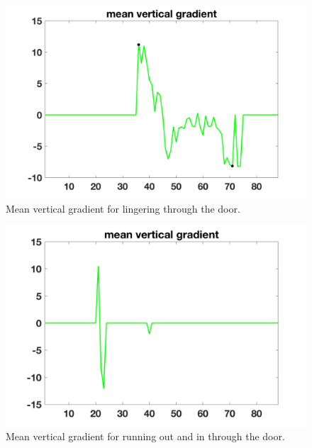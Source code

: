 \documentclass[12pt,oneside]{article} %
\begin{document}
\begin{figure}[htb]
\centering
\includegraphics[scale=0.52]{images/lingerThrough.png}
\caption{Mean vertical gradient for lingering through the door.}
\label{linger}
\end{figure}

\begin{figure}[htb]
\centering
\includegraphics[scale=0.52]{images/runoutandin.png}
\caption{Mean vertical gradient for running out and in through the door.}
\label{run}
\end{figure}
\end{document}
